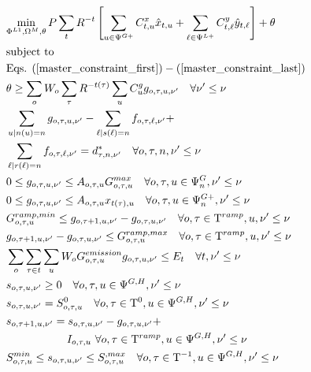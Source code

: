 \documentclass[final]{IEEEtran}
\newcommand{\Tau}{\mathrm{T}}
\begin{document}
\begin{align}
&\label{master_obj} \underset{\Phi^{L1}, \Omega^{M}, \theta}{\text{min}} \, P \sum\limits_{t} R^{-t} \left[ \sum\limits_{u \in \Psi^{G+}} C^x_{t, u} \hat{x}_{t, u} + \sum\limits_{\ell \in \Psi^{L+}} C^y_{t, \ell} \hat{y}_{t, \ell} \right] + \theta \\
&\text{subject to} \nonumber \\
&\text{Eqs. } (\ref{master_constraint_first}) - (\ref{master_constraint_last}) \\
&\theta \geq \sum\limits_o W_o \sum\limits_{\tau} R^{-t(\tau)} \sum\limits_{u} C_{u}^g g_{o, \tau, u, \nu'} \quad \forall \nu' \leq \nu \\
&\sum\limits_{u | n(u) = n} g_{o, \tau, u, \nu'} - \sum\limits_{\ell | s(\ell) = n} f_{o, \tau, \ell, \nu'} + \nonumber \\
&\sum\limits_{\ell | r(\ell) = n} f_{o, \tau, \ell, \nu'} = d_{\tau, n, \nu'}^* \quad \forall o, \tau, n, \nu' \leq \nu \\
&0 \leq g_{o, \tau, u, \nu'} \leq A_{o, \tau, u} G_{o, \tau, u}^{max} \quad \forall o, \tau, u \in \Psi_n^G, \nu' \leq \nu \\
&0 \leq g_{o, \tau, u, \nu'} \leq A_{o, \tau, u} x_{t(\tau), u} \quad \forall o, \tau, u \in \Psi_n^{G+}, \nu' \leq \nu \\
&G^{ramp,min}_{o, \tau, u} \leq g_{o, \tau + 1, u, \nu'} - g_{o, \tau, u, \nu'} \quad \forall o, \tau \in \Tau^{ramp}, u, \nu' \leq \nu \\
&g_{o, \tau + 1, u, \nu'} - g_{o, \tau, u, \nu'} \leq G^{ramp,max}_{o, \tau, u} \quad \forall o, \tau \in \Tau^{ramp}, u, \nu' \leq \nu \\
&\sum\limits_{o} \sum\limits_{\tau \in t} \sum\limits_{u} W_o G^{emission}_{o, \tau, u} g_{o, \tau, u, \nu'}  \leq E_{t} \quad \forall t, \nu' \leq \nu \\
&s_{o, \tau, u, \nu'} \geq 0 \quad \forall o, \tau, u \in \Psi^{G, H}, \nu' \leq \nu \\
&s_{o, \tau, u, \nu'} = S^0_{o, \tau, u} \quad \forall o, \tau \in \Tau^0, u \in \Psi^{G, H}, \nu' \leq \nu \\
&s_{o, \tau + 1, u, \nu'} = s_{o, \tau, u, \nu'} - g_{o, \tau, u, \nu'} + \nonumber \\
&\quad \quad \quad \quad \quad \, \, \, I_{o, \tau, u} \, \, \forall o, \tau \in \Tau^{ramp}, u \in \Psi^{G, H}, \nu' \leq \nu \\
&S^{min}_{o, \tau, u} \leq s_{o, \tau, u, \nu'} \leq S^{, max}_{o, \tau, u} \quad \forall o, \tau \in \Tau^{-1}, u \in \Psi^{G, H}, \nu' \leq \nu \\

\end{align}
\end{document}
